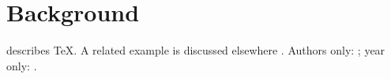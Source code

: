 \documentclass[11pt]{article}
\begin{document}
\section{Background}\citet{knuth1984} describes TeX.
A related example is discussed elsewhere \citep[see][p.~3]{demo2024}.
Authors only: \citeauthor{knuth1984}; year only: \citeyear{knuth1984}.

\end{document}
